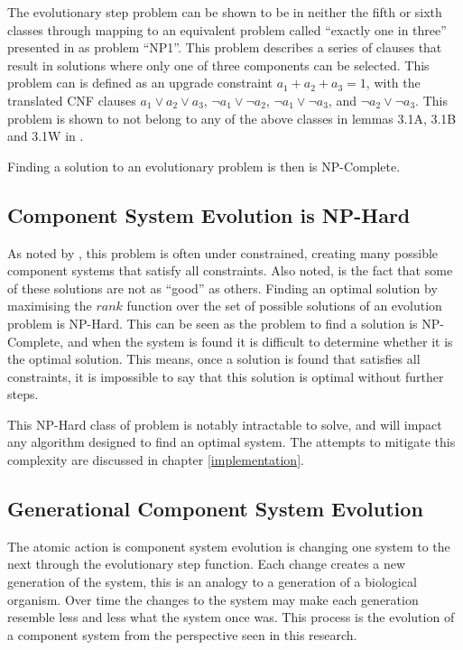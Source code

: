 The evolutionary step problem can be shown to be in neither the fifth or sixth classes 
through mapping to an equivalent problem called ``exactly one in three'' presented in \cite{Schaefer1978} as problem ``NP1''.
This problem describes a series of clauses that result in solutions where only one of three components can be selected. 
This problem can is defined as an upgrade constraint $a_1 + a_2 + a_3 = 1$,  
with the translated CNF clauses $a_1 \vee a_2 \vee a_3$, $\neg a_1 \vee \neg a_2$, $\neg a_1 \vee \neg a_3$, and $\neg a_2 \vee \neg a_3$.
This problem is shown to not belong to any of the above classes in lemmas 3.1A, 3.1B and 3.1W in \cite{Schaefer1978}.

Finding a solution to an evolutionary problem is then is NP-Complete. 

\subsection{Component System Evolution is NP-Hard}
As noted by \cite{Berre2008}, this problem is often under constrained, creating many possible component systems that satisfy all constraints.
Also noted, is the fact that some of these solutions are not as ``good'' as others.
Finding an optimal solution by maximising the $rank$ function over the set of possible solutions of an evolution problem is NP-Hard.
This can be seen as the problem to find a solution is NP-Complete, and when the system is found it is difficult to determine whether it is the optimal solution.
This means, once a solution is found that satisfies all constraints, it is impossible to say that this solution is optimal without further steps. 

This NP-Hard class of problem is notably intractable to solve, and will impact any algorithm designed to find an optimal system.
The attempts to mitigate this complexity are discussed in chapter \ref{implementation}.

\subsection{Generational Component System Evolution}
\label{formal.evo}
The atomic action is component system evolution is changing one system to the next through the evolutionary step function.
Each change creates a new generation of the system, this is an analogy to a generation of a biological organism.
Over time the changes to the system may make each generation resemble less and less what the system once was.
This process is the evolution of a component system from the perspective seen in this research. 

